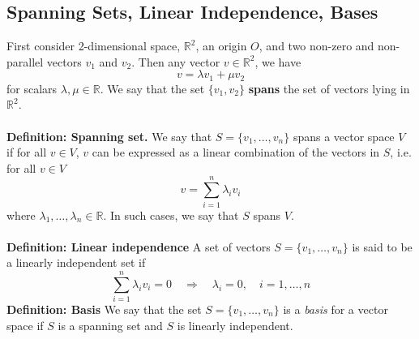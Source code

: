 \documentclass[12pt]{article}
\begin{document}
\subsection*{Spanning Sets, Linear Independence, Bases}
First consider 2-dimensional space, $\mathbb{R}^2$, an origin $O$, and two non-zero and non-parallel vectors $v_{1}$ and $v_{2}$. Then any vector $v\in\mathbb{R}^2$, we have
\begin{equation}
    v = \lambda v_{1} + \mu v_{2}
\end{equation}
for scalars $\lambda, \mu\in\mathbb{R}$. We say that the set $\{v_{1}, v_{2}\}$ \textbf{spans} the set of vectors lying in $\mathbb{R}^2$.\\\\
\textbf{Definition: Spanning set.} We say that $S = \{v_{1}, \dots, v_{n}\}$ spans a vector space $V$ if for all $v\in V$, $v$ can be expressed as a linear combination of the vectors in $S$, i.e. for all $v\in V$
\begin{equation}
    v = \sum_{i=1}^{n}\lambda_{i}v_{i}
\end{equation}
where $\lambda_{1}, \dots, \lambda_{n}\in\mathbb{R}$. In such cases, we say that $S$ spans $V$.\\\\
\textbf{Definition: Linear independence} A set of vectors $S = \{v_{1}, \dots, v_{n}\}$ is said to be a linearly independent set if
\begin{equation}
    \sum_{i=1}^{n}\lambda_{i}v_{i} = 0 \quad \Rightarrow \quad \lambda_{i} = 0, \quad i = 1, \dots, n
\end{equation}
\textbf{Definition: Basis} We say that the set $S = \{v_{1}, \dots, v_{n}\}$ is a \textit{basis} for a vector space if $S$ is a spanning set and $S$ is linearly independent.
\end{document}
